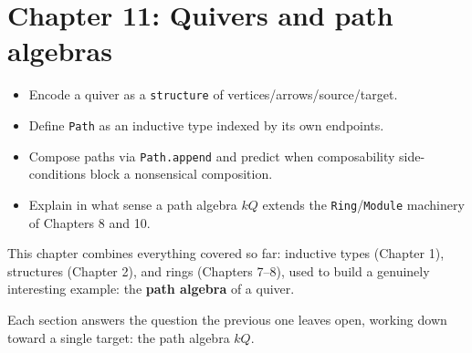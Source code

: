 \chapter{Chapter 11: Quivers and path algebras}\label{sec:11-path-algebras:00-index:1}

\begin{learningobjectives}
\begin{itemize}
\tightlist
\item
  Encode a quiver as a \texttt{structure} of vertices/arrows/source/target.
\item
  Define \texttt{Path} as an inductive type indexed by its own endpoints.
\item
  Compose paths via \texttt{Path.append} and predict when composability side-conditions block a nonsensical composition.
\item
  Explain in what sense a path algebra \(kQ\) extends the \texttt{Ring}/\texttt{Module} machinery of Chapters 8 and 10.
\end{itemize}
\end{learningobjectives}


This chapter combines everything covered so far: inductive types (Chapter 1), structures (Chapter 2), and rings (Chapters 7--8), used to build a genuinely interesting example: the \textbf{path algebra} of a quiver.

Each section answers the question the previous one leaves open, working down toward a single target: the path algebra \(kQ\).

